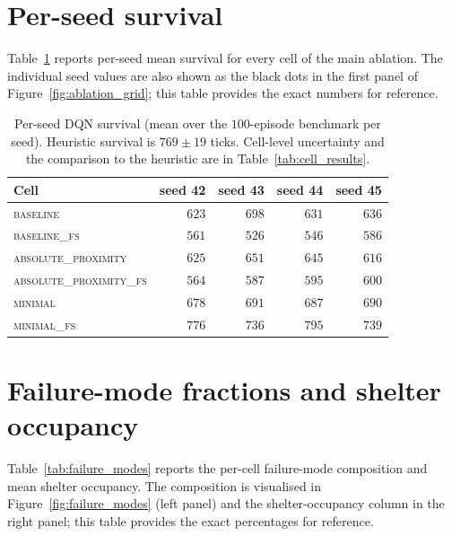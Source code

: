 \documentclass[12pt,a4paper,titlepage]{article}
\begin{document}
\section{Per-seed survival}
\label{app:per_seed}

Table~\ref{tab:per_seed} reports per-seed mean survival for every cell of the main ablation. The individual seed values are also shown as the black dots in the first panel of Figure~\ref{fig:ablation_grid}; this table provides the exact numbers for reference.

\begin{table}[!ht]
\centering
\caption{Per-seed DQN survival (mean over the $100$-episode benchmark per seed). Heuristic survival is $769 \pm 19$ ticks. Cell-level uncertainty and the comparison to the heuristic are in Table~\ref{tab:cell_results}.}
\label{tab:per_seed}
\footnotesize
\begin{tabular}{lrrrr}
\toprule
Cell                              & seed 42 & seed 43 & seed 44 & seed 45 \\
\midrule
\textsc{baseline}                 & $623$ & $698$ & $631$ & $636$ \\
\textsc{baseline\_fs}             & $561$ & $526$ & $546$ & $586$ \\
\textsc{absolute\_proximity}      & $625$ & $651$ & $645$ & $616$ \\
\textsc{absolute\_proximity\_fs}  & $564$ & $587$ & $595$ & $600$ \\
\textsc{minimal}                  & $678$ & $691$ & $687$ & $690$ \\
\textsc{minimal\_fs}              & $776$ & $736$ & $795$ & $739$ \\
\bottomrule
\end{tabular}
\end{table}

\section{Failure-mode fractions and shelter occupancy}
\label{app:failure_modes}

Table~\ref{tab:failure_modes} reports the per-cell failure-mode composition and mean shelter occupancy. The composition is visualised in Figure~\ref{fig:failure_modes} (left panel) and the shelter-occupancy column in the right panel; this table provides the exact percentages for reference.
\end{document}
